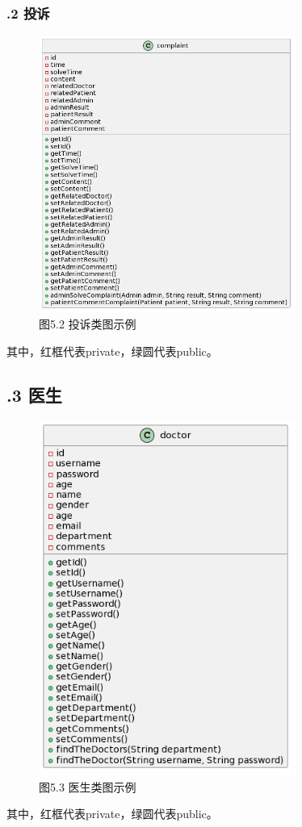 \documentclass[24pt,a4paper]{article}%
\begin{document}
\subsubsection*{.2 投诉}
\begin{figure}[H]
    \centering
    \includegraphics[width=0.75\textwidth]{images/complaint.png}
    \caption*{图5.2 投诉类图示例}
\end{figure}
其中，红框代表private，绿圆代表public。
\subsection*{.3 医生}
\begin{figure}[H]
    \centering
    \includegraphics[width=0.75\textwidth]{images/doctor.png}
    \caption*{图5.3 医生类图示例}
\end{figure}
其中，红框代表private，绿圆代表public。
\end{document}
